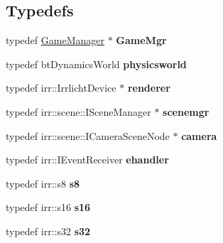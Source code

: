 \subsection*{Typedefs}
\begin{DoxyCompactItemize}
\item 
\hypertarget{namespace_micro_f_p_s_a90d46923addb5f8fb5b73a56eeee390f}{
typedef \hyperlink{class_micro_f_p_s_1_1_game_manager}{GameManager} $\ast$ {\bfseries GameMgr}}
\label{d4/d58/namespace_micro_f_p_s_a90d46923addb5f8fb5b73a56eeee390f}

\item 
\hypertarget{namespace_micro_f_p_s_a3e97eb8f1f229feafba632e8f7c95268}{
typedef btDynamicsWorld {\bfseries physicsworld}}
\label{d4/d58/namespace_micro_f_p_s_a3e97eb8f1f229feafba632e8f7c95268}

\item 
\hypertarget{namespace_micro_f_p_s_ad6934f613bc884bb4493c702c3eee5d0}{
typedef irr::IrrlichtDevice $\ast$ {\bfseries renderer}}
\label{d4/d58/namespace_micro_f_p_s_ad6934f613bc884bb4493c702c3eee5d0}

\item 
\hypertarget{namespace_micro_f_p_s_a89e8fee92bef2c1b19ee28efefe64960}{
typedef irr::scene::ISceneManager $\ast$ {\bfseries scenemgr}}
\label{d4/d58/namespace_micro_f_p_s_a89e8fee92bef2c1b19ee28efefe64960}

\item 
\hypertarget{namespace_micro_f_p_s_a53a4d533b35902a1032197497364b148}{
typedef irr::scene::ICameraSceneNode $\ast$ {\bfseries camera}}
\label{d4/d58/namespace_micro_f_p_s_a53a4d533b35902a1032197497364b148}

\item 
\hypertarget{namespace_micro_f_p_s_ac8a43668c05efd2e50267fa344acb58c}{
typedef irr::IEventReceiver {\bfseries ehandler}}
\label{d4/d58/namespace_micro_f_p_s_ac8a43668c05efd2e50267fa344acb58c}

\item 
\hypertarget{namespace_micro_f_p_s_a169045c0ddf665f2066a3401d0f0b2e1}{
typedef irr::s8 {\bfseries s8}}
\label{d4/d58/namespace_micro_f_p_s_a169045c0ddf665f2066a3401d0f0b2e1}

\item 
\hypertarget{namespace_micro_f_p_s_a12227428713e904f82c31afa09cbce67}{
typedef irr::s16 {\bfseries s16}}
\label{d4/d58/namespace_micro_f_p_s_a12227428713e904f82c31afa09cbce67}

\item 
\hypertarget{namespace_micro_f_p_s_a0eae39ad2d4bce19297e8efe7ac7b690}{
typedef irr::s32 {\bfseries s32}}
\label{d4/d58/namespace_micro_f_p_s_a0eae39ad2d4bce19297e8efe7ac7b690}


\end{DoxyCompactItemize}
